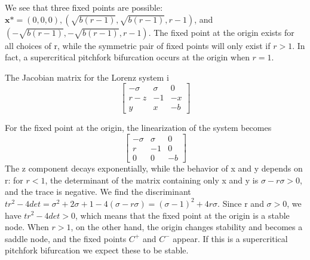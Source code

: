 \documentclass{report}
\begin{document}
We see that three fixed points are possible: \( \boldsymbol{x\mbox{*}} = (0,0,0),(\sqrt{b(r-1)},\sqrt{b(r-1)},r-1)\), and \((-\sqrt{b(r-1)},-\sqrt{b(r-1)},r-1)\).
The fixed point at the origin exists for all choices of r, while the symmetric 
pair of fixed points will only exist if \(r > 1\). In fact, a supercritical 
pitchfork bifurcation occurs at the origin when \( r = 1 \).

The Jacobian matrix for the Lorenz system i
\[
\begin{bmatrix}
   -\sigma & \sigma & 0 \\
   r - z & -1 & -x \\
   y & x & -b
\end{bmatrix}
\]

For the fixed point at the origin, the linearization of the system becomes
\[
\begin{bmatrix}
   -\sigma & \sigma & 0 \\
   r & -1 & 0 \\
   0 & 0 & -b

\end{bmatrix}
\]
The z component decays exponentially, while the behavior of x and y depends on 
r: for \( r < 1\), the determinant of the matrix containing only x and y is
\(\sigma - r\sigma > 0\), and the trace is negative. We find the discriminant 
\(tr^2 - 4det = \sigma^2 +2\sigma + 1 -4(\sigma -r\sigma) = (\sigma - 1)^2 +
  4r\sigma\). Since r and \(\sigma > 0 \), we have \(tr^2 -4det > 0\), which 
means that the fixed point at the origin is a stable node. When \(r > 1\), on 
the other hand, the origin changes stability and becomes a saddle node, and the
fixed points \(C^+\) and \(C^-\) appear. If this is a supercritical pitchfork
bifurcation we expect these to be stable.
\end{document}
